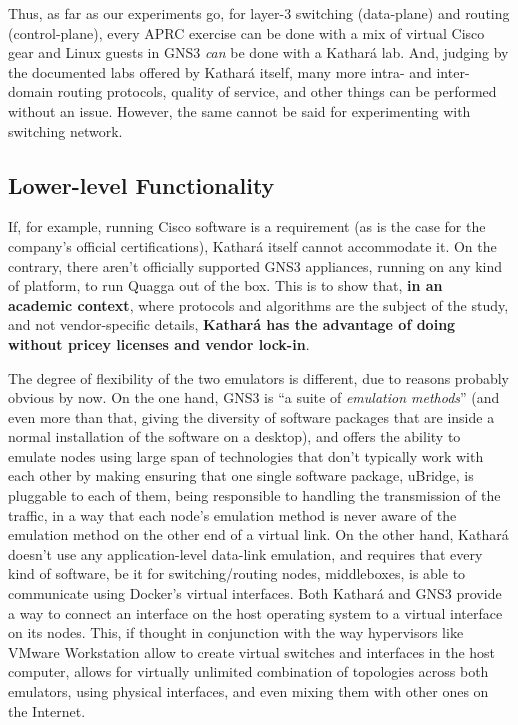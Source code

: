 Thus, as far as our experiments go, for layer-3 switching (data-plane) and routing (control-plane), every APRC exercise can be done with a mix of virtual Cisco gear and Linux guests in GNS3 \emph{can} be done with a Kathará lab.
And, judging by the documented labs offered by Kathará itself, many more intra- and inter-domain routing protocols, quality of service, and other things can be performed without an issue.
However, the same cannot be said for experimenting with switching network. %

\subsection{Lower-level Functionality}

If, for example, running Cisco software is a requirement (as is the case for the company's official certifications), Kathará itself cannot accommodate it.
On the contrary, there aren't officially supported GNS3 appliances, running on any kind of platform, to run Quagga out of the box.
This is to show that, \textbf{in an academic context}, where protocols and algorithms are the subject of the study, and not vendor-specific details, \textbf{Kathará has the advantage of doing without pricey licenses and vendor lock-in}.

The degree of flexibility of the two emulators is different, due to reasons probably obvious by now.
On the one hand, GNS3 is ``a suite of \emph{emulation methods}'' (and even more than that, giving the diversity of software packages that are inside a normal installation of the software on a desktop), and offers the ability to emulate nodes using large span of technologies that don't typically work with each other by making ensuring that one single software package, uBridge, is pluggable to each of them, being responsible to handling the transmission of the traffic, in a way that each node's emulation method is never aware of the emulation method on the other end of a virtual link.
On the other hand, Kathará doesn't use any application-level data-link emulation, and requires that every kind of software, be it for switching/routing nodes, middleboxes, is able to communicate using Docker's virtual interfaces.
Both Kathará and GNS3 provide a way to connect an interface on the host operating system to a virtual interface on its nodes.
This, if thought in conjunction with the way hypervisors like VMware Workstation allow to create virtual switches and interfaces in the host computer, allows for virtually unlimited combination of topologies across both emulators, using physical interfaces, and even mixing them with other ones on the Internet.

